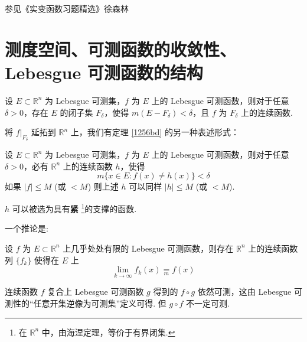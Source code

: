 参见《实变函数习题精选》徐森林

\section{测度空间、可测函数的收敛性、Lebesgue 可测函数的结构}

\begin{theorem}
设 $E\subset \mathbb{R}^{n}$ 为 Lebesgue 可测集，$f$ 为 $E$ 上的 Lebesgue 可测函数，则对于任意 $\delta>0$，存在 $E$ 的闭子集 $F_{\delta}$，使得 $m(E-F_{\delta})<\delta$，且 $f$ 为 $F_{\delta}$ 上的连续函数.\label{1256bd}
\end{theorem}

将 $\left.f\right|_{F_{\delta}}$ 延拓到 $\mathbb{R}^{n}$ 上，我们有定理 \cref{1256bd} 的另一种表述形式：

\begin{theorem}
设 $E\subset \mathbb{R}^{n}$ 为 Lebesgue 可测集，$f$ 为 $E$ 上的 Lebesgue 可测函数，则对于任意 $\delta>0$，必有 $\mathbb{R}^{n}$ 上的连续函数 $h$，使得
\[
m\{ x\in E:f(x)\neq h(x) \}<\delta
\]
如果 $\lvert f \rvert\leq M$ (或 $<M$) 则上述 $h$ 可以同样 $\lvert h \rvert\leq M$ (或 $<M$).
\end{theorem}
\begin{remark}
$h$ 可以被选为具有\textbf{紧} \footnote{在 $\mathbb{R}^{n}$ 中，由海涅定理，等价于有界闭集.}的支撑的函数.
\end{remark}
一个推论是:

\begin{corollary}
设 $f$ 为 $E\subset \mathbb{R}^{n}$ 上几乎处处有限的 Lebesgue 可测函数，则存在 $\mathbb{R}^{n}$ 上的连续函数列 $\{ f_k \}$ 使得在 $E$ 上
\[
\lim_{ k \to \infty }f_k(x)\underset{ m }{ =  }f(x)
\]
\end{corollary}
连续函数 $f$ 复合上 Lebesgue 可测函数 $g$ 得到的 $f\circ g$ 依然可测，这由 Lebesgue 可测性的“任意开集逆像为可测集”定义可得. 但 $g\circ f$ 不一定可测.

